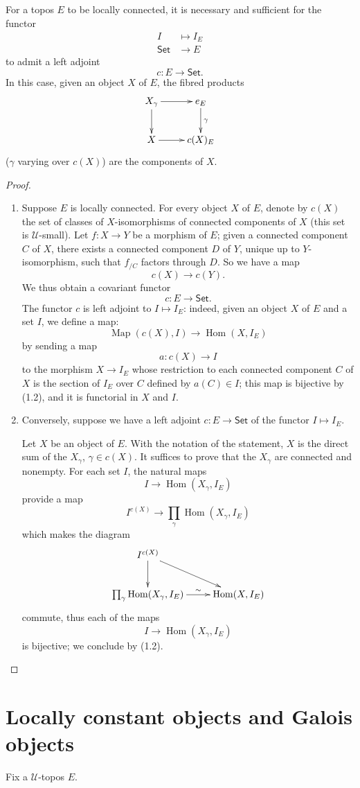 \documentclass[10pt,oneside]{amsart}
\newcommand{\oldpage}[1]{\marginnote{\textbf{#1}}}
\newcommand{\cal}{\mathcal}
\newcommand{\cat}{\mathsf}
\DeclareMathOperator{\Hom}{Hom}
\DeclareMathOperator{\Map}{Map}
\begin{document}
\subsection{}
For a topos $E$ to be locally connected, it is necessary and sufficient for the functor
\begin{align*}
  I & \longmapsto I_E\\
  \cat{Set} & \longrightarrow E
\end{align*}
to admit a left adjoint
\[
  c:E\longrightarrow\cat{Set}.
\]
In this case, given an object $X$ of $E$, the fibred products
\[
  \xymatrix{
    X_\gamma\ar[r]\ar[d] & e_E\ar[d]^\gamma\\
    X\ar[r] & c(X)_E
  }
\]
($\gamma$ varying over $c(X)$) are the components of $X$.

\begin{proof}
\medskip\noindent
\begin{enumerate}[label=(\roman*)]
  \item Suppose $E$ is locally connected.
    For every object $X$ of $E$, denote by $c(X)$ the set of classes of $X$-isomorphisms of connected components of $X$ (this set is $\cal{U}$-small).
    Let $f:X\to Y$ be a morphism of $E$;
    given a connected component $C$ of $X$, there exists a connected component $D$ of $Y$, unique up to $Y$-isomorphism, such that $f_{/C}$ factors through $D$.
    So we have a map
    \[
      c(X)\longrightarrow c(Y).
    \]
    \oldpage{4}
    We thus obtain a covariant functor
    \[
      c:E\longrightarrow\cat{Set}.
    \]
    The functor $c$ is left adjoint to $I\mapsto I_E$: indeed, given an object $X$ of $E$ and a set $I$, we define a map:
    \[
      \Map(c(X),I)\longrightarrow\Hom(X,I_E)
    \]
    by sending a map
    \[
      a:c(X)\longrightarrow I
    \]
    to the morphism $X\to I_E$ whose restriction to each connected component $C$ of $X$ is the section of $I_E$ over $C$ defined by $a(C)\in I$;
    this map is bijective by (1.2), and it is functorial in $X$ and $I$.
  \item Conversely, suppose we have a left adjoint $c:E\to\cat{Set}$ of the functor $I\mapsto I_E$.

    Let $X$ be an object of $E$.
    With the notation of the statement, $X$ is the direct sum of the $X_\gamma$, $\gamma\in c(X)$.
    It suffices to prove that the $X_\gamma$ are connected and nonempty.
    For each set $I$, the natural maps
    \[
      I\longrightarrow\Hom(X_\gamma,I_E)
    \]
    provide a map
    \[
      I^{c(X)}\longrightarrow\prod_\gamma\Hom(X_\gamma,I_E)
    \]
    which makes the diagram
    \[
      \xymatrix{
        I^{c(X)}\ar[rd]\ar[d]\\
        \prod_\gamma\Hom(X_\gamma,I_E)\ar[r]^-\sim & \Hom(X,I_E)
      }
    \]
    commute, thus each of the maps
    \[ 
      I\longrightarrow\Hom(X_\gamma,I_E)
    \]
    is bijective;
    we conclude by (1.2).
\end{enumerate}
\end{proof}

\section{Locally constant objects and Galois objects}
\oldpage{5}

Fix a $\cal{U}$-topos $E$.
\end{document}
